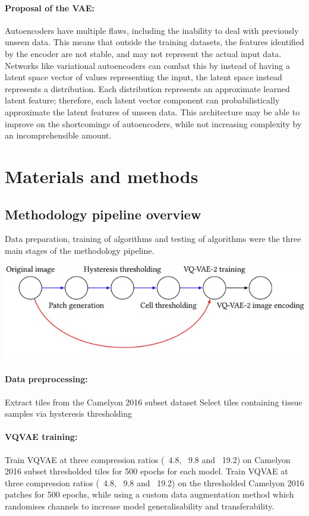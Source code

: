 \documentclass[review]{elsarticle}
\begin{document}
\paragraph{Proposal of the VAE:} Autoencoders have multiple flaws, including the inability to deal with previously unseen data. This means that outside the training datasets, the features identified by the encoder are not stable, and may not represent the actual input data. Networks like variational autoencoders can combat this by instead of having a latent space vector of values representing the input, the latent space instead represents a distribution. Each distribution represents an approximate learned latent feature; therefore, each latent vector component can probabilistically approximate the latent features of unseen data.
This architecture may be able to improve on the shortcomings of autoencoders, while not increasing complexity by an incomprehensible amount.

\section{Materials and methods}
\subsection{Methodology pipeline overview}
Data preparation, training of algorithms and testing of algorithms were the three main stages of the methodology pipeline.

\begin{center}
\includegraphics[width=1\linewidth]{Figures/Overview VQVAE pipeline.jpeg}
\end{center}

\paragraph{Data preprocessing:}
	Extract tiles from the Camelyon 2016 subset dataset
	Select tiles containing tissue samples via hysteresis thresholding
\paragraph{VQVAE training:}
	Train VQVAE at three compression ratios (~4.8, ~9.8 and ~19.2) on Camelyon 2016 subset thresholded tiles for 500 epochs for each model.
	Train VQVAE at three compression ratios (~4.8, ~9.8 and ~19.2) on the thresholded Camelyon 2016 patches for 500 epochs, while using a custom data augmentation method which randomises channels to increase model generalisability and transferability.
\end{document}
